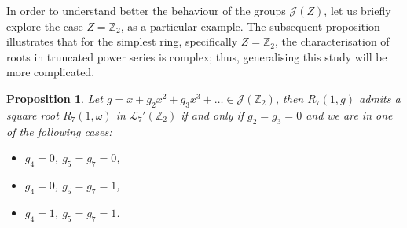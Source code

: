 \documentclass[preprint,12pt]{elsarticle}
\newtheorem{prop}[thm]{Proposition}
\begin{document}
In order to understand better the behaviour of the groups $\mathcal J(Z)$, let us briefly explore the case $Z=\mathbb Z_2$, as a particular example. The subsequent proposition illustrates that for the simplest ring, specifically \( Z = \mathbb{Z}_2 \), the characterisation of roots in truncated power series is complex; thus, generalising this study will be more complicated.

\begin{prop}
    
 Let $g=x+g_2x^2+g_3x^3+\ldots\in\mathcal J(\mathbb Z_2)$, then  $R_{7}(1,g)$ admits a square root $R_{7}(1,\omega)$ in $\mathcal{L}_{7}'(\mathbb Z_2)$  if and only if $g_2=g_3=0$ and we are in one of the following cases: 


\begin{itemize}

\item  $g_4=0$, $g_5=g_7=0$,

\item $g_4=0$, $g_5=g_7=1$,

\item  $g_4=1$, $g_5=g_7=1$.



\end{itemize}

\end{prop}
\end{document}
